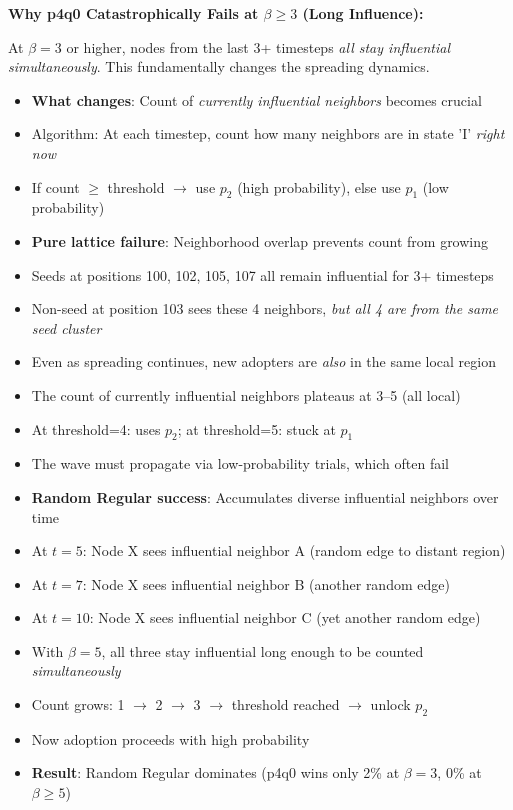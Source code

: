 \documentclass[12pt,a4paper]{article}
\begin{document}
\textbf{Why p4q0 Catastrophically Fails at $\beta \geq 3$ (Long Influence):}

At $\beta=3$ or higher, nodes from the last 3+ timesteps \textit{all stay influential simultaneously}. This fundamentally changes the spreading dynamics.

\begin{itemize}
    \item \textbf{What changes}: Count of \textit{currently influential neighbors} becomes crucial
    \item Algorithm: At each timestep, count how many neighbors are in state 'I' \textit{right now}
    \item If count $\geq$ threshold $\to$ use $p_2$ (high probability), else use $p_1$ (low probability)
    \item \textbf{Pure lattice failure}: Neighborhood overlap prevents count from growing
    \item Seeds at positions 100, 102, 105, 107 all remain influential for 3+ timesteps
    \item Non-seed at position 103 sees these 4 neighbors, \textit{but all 4 are from the same seed cluster}
    \item Even as spreading continues, new adopters are \textit{also} in the same local region
    \item The count of currently influential neighbors plateaus at 3--5 (all local)
    \item At threshold=4: uses $p_2$; at threshold=5: stuck at $p_1$
    \item The wave must propagate via low-probability trials, which often fail
    \item \textbf{Random Regular success}: Accumulates diverse influential neighbors over time
    \item At $t=5$: Node X sees influential neighbor A (random edge to distant region)
    \item At $t=7$: Node X sees influential neighbor B (another random edge)
    \item At $t=10$: Node X sees influential neighbor C (yet another random edge)
    \item With $\beta=5$, all three stay influential long enough to be counted \textit{simultaneously}
    \item Count grows: 1 $\to$ 2 $\to$ 3 $\to$ threshold reached $\to$ unlock $p_2$
    \item Now adoption proceeds with high probability
    \item \textbf{Result}: Random Regular dominates (p4q0 wins only 2\% at $\beta=3$, 0\% at $\beta \geq 5$)
\end{itemize}
\end{document}

